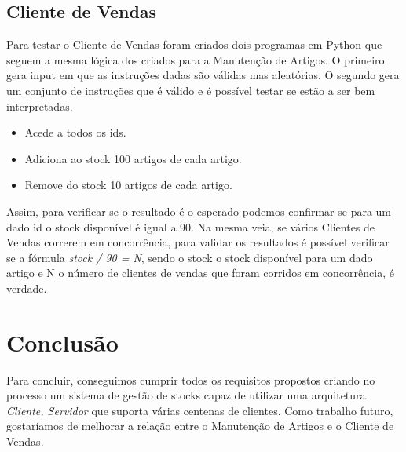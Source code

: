 \documentclass[a4paper]{report}
\begin{document}
\section{Cliente de Vendas}

Para testar o Cliente de Vendas foram criados dois programas em Python que
seguem a mesma lógica dos criados para a Manutenção de Artigos.
O primeiro gera input em que as instruções dadas são válidas mas aleatórias.
O segundo gera um conjunto de instruções que é válido e é possível testar se estão
a ser bem interpretadas.
\begin{itemize} 
    \item Acede a todos os ids.
    \item Adiciona ao stock 100 artigos de cada artigo.
    \item Remove do stock 10 artigos de cada artigo.
\end{itemize}
Assim, para verificar se o resultado é o esperado podemos confirmar se para um dado
id o stock disponível é igual a 90.
Na mesma veia, se vários Clientes de Vendas correrem em concorrência, para validar
os resultados é possível verificar se a fórmula \textit{stock / 90 = N}, sendo o stock o stock
disponível para um dado artigo e N o número de clientes de vendas que foram corridos
em concorrência, é verdade.

\chapter{Conclusão}

Para concluir, conseguimos cumprir todos os requisitos propostos criando no processo um
sistema de gestão de stocks capaz de utilizar uma arquitetura \textit{Cliente, Servidor}
que suporta várias centenas de clientes.
Como trabalho futuro, gostaríamos de melhorar a relação entre o Manutenção de Artigos e
o Cliente de Vendas.
\end{document}
